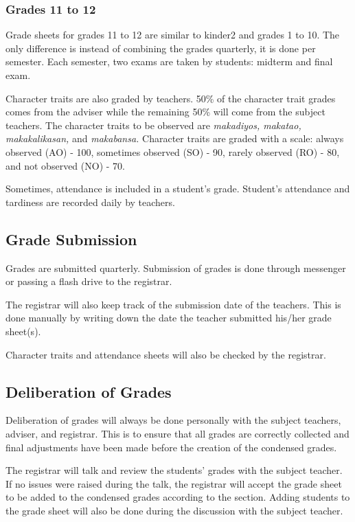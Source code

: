 \documentclass[11pt,a4paper,titlepage]{article}
\begin{document}
\subsubsection{Grades 11 to 12}
Grade sheets for grades 11 to 12 are similar to kinder2 and grades 1 to 10. The only difference is instead of combining the grades quarterly, it is done per semester. Each semester, two exams are taken by students: midterm and final exam.

Character traits are also graded by teachers. 50\% of the character trait grades comes from the adviser while the remaining 50\% will come from the subject teachers. The character traits to be observed are \textit{makadiyos, makatao, makakalikasan,} and \textit{makabansa.} Character traits are graded with a scale: always observed (AO) - 100, sometimes observed (SO) - 90, rarely observed (RO) - 80, and not observed (NO) - 70.

Sometimes, attendance is included in a student's grade. Student's attendance and tardiness are recorded daily by teachers.

\subsection{Grade Submission}

Grades are submitted quarterly. Submission of grades is done through messenger or passing a flash drive to the registrar.

The registrar will also keep track of the submission date of the teachers. This is done manually by writing down the date the teacher submitted his/her grade sheet(s).

Character traits and attendance sheets will also be checked by the registrar.

\subsection{Deliberation of Grades}

Deliberation of grades will always be done personally with the subject teachers, adviser, and registrar. This is to ensure that all grades are correctly collected and final adjustments have been made before the creation of the condensed grades.

The registrar will talk and review the students' grades with the subject teacher. If no issues were raised during the talk, the registrar will accept the grade sheet to be added to the condensed grades according to the section. Adding students to the grade sheet will also be done during the discussion with the subject teacher.
\end{document}
